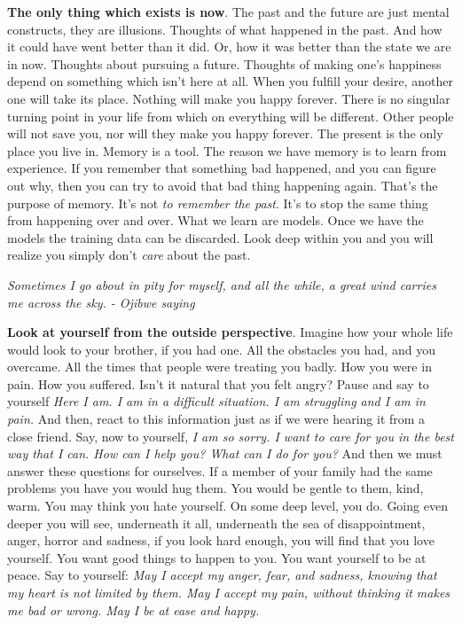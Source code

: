 \documentclass[a4paper,hidelinks]{article}
\begin{document}
\textbf{The only thing which exists is now}.
The past and the future are just mental constructs, they are illusions.
Thoughts of what happened in the past.
And how it could have went better than it did.
Or, how it was better than the state we are in now.
Thoughts about pursuing a future.
Thoughts of making one's happiness depend on something which isn't here at all.
When you fulfill your desire, another one will take its place.
Nothing will make you happy forever.
There is no singular turning point in your life from which on everything will be different.
Other people will not save you, nor will they make you happy forever.
The present is the only place you live in.
Memory is a tool.
The reason we have memory is to learn from experience.
If you remember that something bad happened, and you can figure out why, then you can try to avoid that bad thing happening again.
That’s the purpose of memory.
It’s not \textit{to remember the past}.
It’s to stop the same thing from happening over and over.
What we learn are models.
Once we have the models the training data can be discarded.
Look deep within you and you will realize you simply don't \textit{care} about the past.

\newpage

\begin{center}
\textit{
Sometimes I go about in pity for myself, and all the while, a great wind carries me across the sky. - Ojibwe saying
}
\end{center}

\textbf{Look at yourself from the outside perspective}.
Imagine how your whole life would look to your brother, if you had one.
All the obstacles you had, and you overcame.
All the times that people were treating you badly.
How you were in pain.
How you suffered.
Isn't it natural that you felt angry?
Pause and say to yourself
\textit{
Here I am.
I am in a difficult situation.
I am struggling and I am in pain.
}
And then, react to this information just as if we were hearing it from a close friend.
Say, now to yourself,
\textit{
I am so sorry.
I want to care for you in the best way that I can.
How can I help you? What can I do for you?
}
And then we must answer these questions for ourselves.
If a member of your family had the same problems you have you would hug them.
You would be gentle to them, kind, warm.
You may think you hate yourself.
On some deep level, you do.
Going even deeper you will see, underneath it all, underneath the sea of disappointment, anger, horror and sadness, if you look hard enough, you will find that you love yourself.
You want good things to happen to you.
You want yourself to be at peace.
Say to yourself:
\textit{
May I accept my anger, fear, and sadness, knowing that my heart is not limited by them.
May I accept my pain, without thinking it makes me bad or wrong.
May I be at ease and happy.
}
\end{document}
